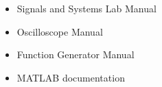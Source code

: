 \begin{itemize}
    \item Signals and Systems Lab Manual
    \item Oscilloscope Manual
    \item Function Generator Manual
    \item MATLAB documentation
\end{itemize}